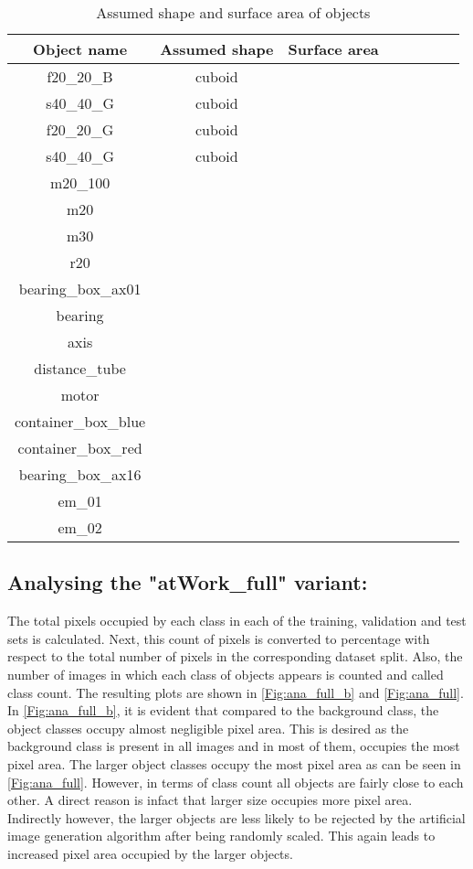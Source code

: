 \documentclass[paper=a4,11pt,parskip=half,toc=listof]{scrartcl}
\begin{document}
		\begin{table}[!htb]
			\centering
			\begin{tabular}{|c|c|c|c|c|c|c|c|}
			\hline 
  			\textbf{Object name} & \textbf{Assumed shape} & \textbf{Surface area} \\ 
			\hline
  			 f20\_20\_B & cuboid &  \\ 
			\hline
  			 s40\_40\_G & cuboid &  \\ 
			\hline
  			 f20\_20\_G & cuboid &  \\ 
			\hline
  			 s40\_40\_G & cuboid &  \\ 
			\hline
  			 m20\_100 &  &  \\ 
			\hline
  			 m20 &  &  \\ 
			\hline
  			 m30 &  &  \\ 
			\hline
  			 r20 &  &  \\ 
			\hline
  			 bearing\_box\_ax01 &  &  \\ 
			\hline
  			 bearing &  &  \\ 
			\hline
  			 axis &  &  \\ 
			\hline
  			 distance\_tube &  &  \\ 
			\hline
  			 motor &  &  \\ 
			\hline
  			 container\_box\_blue &  &  \\ 
			\hline
  			 container\_box\_red &  &  \\ 
			\hline
  			 bearing\_box\_ax16 &  &  \\ 
			\hline
  			 em\_01 &  &  \\ 
			\hline
  			 em\_02 &  &  \\ 
			\hline
			\end{tabular}
			\caption{Assumed shape and surface area of objects} 
			\label{Table:surface}
		\end{table}
		
	\subsection{Analysing the "atWork\_full" variant:}
		The total pixels occupied by each class in each of the training, validation and test sets is calculated. Next, this count of pixels is converted to percentage with respect to the total number of pixels in the corresponding dataset split. Also, the number of images in which each class of objects appears is counted and called class count. The resulting plots are shown in \ref{Fig:ana_full_b} and \ref{Fig:ana_full}. In \ref{Fig:ana_full_b}, it is evident that compared to the background class, the object classes occupy almost negligible pixel area. This is desired as the background class is present in all images and in most of them, occupies the most pixel area. The larger object classes occupy the most pixel area as can be seen in \ref{Fig:ana_full}. However, in terms of class count all objects are fairly close to each other. A direct reason is infact that larger size occupies more pixel area. Indirectly however, the larger objects are less likely to be rejected by the artificial image generation algorithm after being randomly scaled. This again leads to increased pixel area occupied by the larger objects.
			
\end{document}
